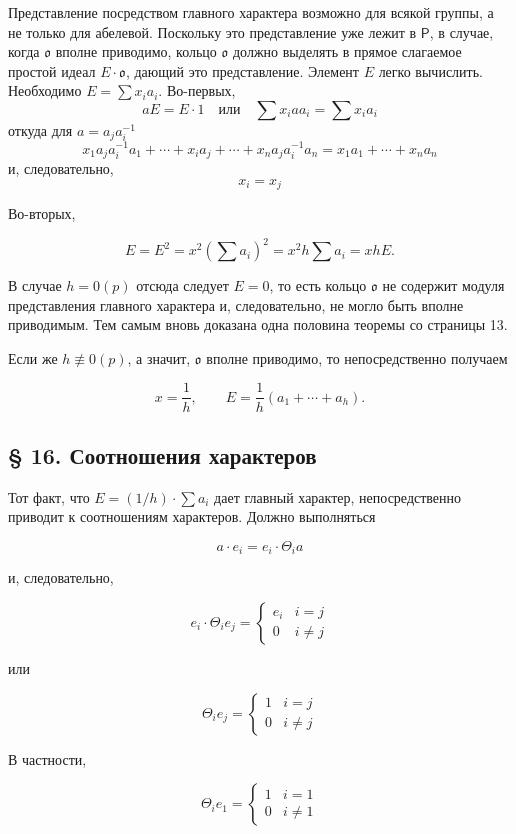 \documentclass[11pt]{article}
\begin{document}
Представление посредством главного характера возможно для всякой группы, а не только для абелевой. Поскольку это представление уже лежит в \(\mathsf P\), в случае, когда \(\mathfrak o\) вполне приводимо, кольцо \(\mathfrak o\) должно выделять в прямое слагаемое простой идеал \(E\cdot\mathfrak o\), дающий это представление. Элемент \(E\) легко вычислить. Необходимо \(E=\sum x_i a_i\). Во-первых,
\[
aE=E\cdot 1\quad\text{или}\quad \sum x_i a a_i=\sum x_i a_i
\]
откуда для \(a=a_j a_i^{-1}\)
\[
x_1a_ja_i^{-1}a_1+\cdots+x_i a_j+\cdots+x_na_ja_i^{-1}a_n
=x_1a_1+\cdots+x_na_n
\]
и, следовательно,
\[
x_i=x_j
\]

Во-вторых,

\[
E=E^2=x^2\left(\sum a_i\right)^2=x^2h\sum a_i=xhE.
\]

В случае \(h=0(p)\) отсюда следует \(E=0\), то есть кольцо \(\mathfrak o\) не содержит модуля представления главного характера и, следовательно, не могло быть вполне приводимым. Тем самым вновь доказана одна половина теоремы со страницы 13.

Если же \(h\not\equiv0(p)\), а значит, \(\mathfrak o\) вполне приводимо, то непосредственно получаем

\[
x=\frac{1}{h},\qquad E=\frac{1}{h}(a_1+\cdots+a_h).
\]

\subsection*{§ 16. Соотношения характеров}\label{die-charakterenrelationen}

Тот факт, что \(E=(1/h)\cdot\sum a_i\) дает главный характер, непосредственно приводит к соотношениям характеров. Должно выполняться

\[a \cdot e_i = e_i \cdot \Theta_i a\]

и, следовательно,

\[e_i \cdot \Theta_i e_j = \begin{cases} e_i & i = j \\ 0 & i \neq j \end{cases}\]

или

\[\Theta_i e_j = \begin{cases} 1 & i = j \\ 0 & i \neq j \end{cases}\]

В частности,

\[\Theta_i e_1 = \begin{cases} 1 & i = 1 \\ 0 & i \neq 1 \end{cases}\]
\end{document}
